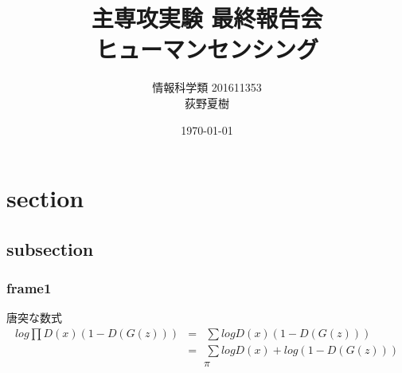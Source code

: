 \documentclass[dvipdfmx,12pt]{beamer}
\title[ヒューマンセンシング]{主専攻実験 最終報告会 \\ ヒューマンセンシング}
\author[荻野夏樹]{情報科学類 201611353 \\ 荻野夏樹}
\date{\today}
\begin{document}
\maketitle
\section{section}
\subsection{subsection}
\begin{frame}
	\frametitle{frame1}
唐突な数式
\begin{eqnarray*}
	log \prod D(x)(1-D(G(z))) &=& \sum log D(x)(1-D(G(z))) \\
	                          &=& \sum log D(x) + log (1-D(G(z)))
\end{eqnarray*}
\pause
\begin{eqnarray*}
	\pi
\end{eqnarray*}
\end{frame}
\end{document}
